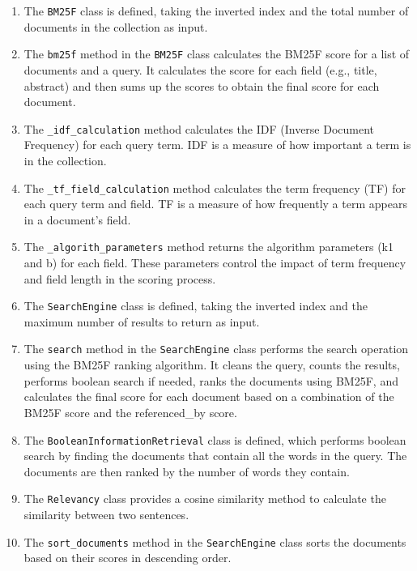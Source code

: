 \documentclass{article}
\begin{document}
\begin{enumerate}
    \item The \texttt{BM25F} class is defined, taking the inverted index and the total number of 
    documents in the collection as input.
    \item The \texttt{bm25f} method in the \texttt{BM25F} class calculates the BM25F score for a 
    list of documents and a query. It calculates the score for each field (e.g., title, 
    abstract) and then sums up the scores to obtain the final score for each document.
    \item The \texttt{\_idf\_calculation} method calculates the IDF (Inverse Document Frequency) 
    for each query term. IDF is a measure of how important a term is in the collection.
    \item The \texttt{\_tf\_field\_calculation} method calculates the term frequency (TF) for 
    each query term and field. TF is a measure of how frequently a term appears in a document's 
    field.
    \item The \texttt{\_algorith\_parameters} method returns the algorithm parameters (k1 and b) 
    for each field. These parameters control the impact of term frequency and field length in 
    the scoring process.
    \item The \texttt{SearchEngine} class is defined, taking the inverted index and the maximum 
    number of results to return as input.
    \item The \texttt{search} method in the \texttt{SearchEngine} class performs the search 
    operation using the BM25F ranking algorithm. It cleans the query, counts the results, 
    performs boolean search if needed, ranks the documents using BM25F, and calculates the final 
    score for each document based on a combination of the BM25F score and the referenced\_by 
    score.
    \item The \texttt{BooleanInformationRetrieval} class is defined, which performs boolean 
    search by finding the documents that contain all the words in the query. The documents are 
    then ranked by the number of words they contain.
    \item The \texttt{Relevancy} class provides a cosine similarity method to calculate the 
    similarity between two sentences.
    \item The \texttt{sort\_documents} method in the \texttt{SearchEngine} class sorts the 
    documents based on their scores in descending order.
\end{enumerate}
\end{document}
